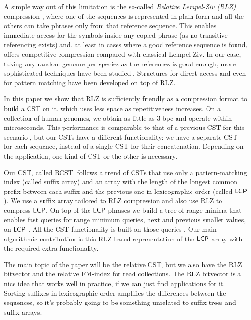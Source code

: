 A simple way out of this limitation is the so-called {\em Relative Lempel-Ziv
(RLZ)} compression \cite{Kuruppu2010}, where one of the sequences is represented
in plain form and all the others can take phrases only from that reference
sequence. This enables immediate access for the symbols inside any copied
phrase (as no transitive referencing exists) and, at least in cases where a
good reference sequence is found, offers competitive compression compared with
classical Lempel-Ziv. In our case, taking any random genome per species as the
references is good enough; more sophisticated techniques have been studied
\cite{KPZ11}. Structures for direct access \cite{DG11,Ferrada2014}
and even for pattern matching \cite{DJSS14,Belazzougui2014} have been developed
on top of RLZ.

In this paper we show that RLZ is sufficiently friendly as a compression format
to build a CST on it, which uses less space as repetitiveness increases. 
On a collection of human genomes, we obtain as little as 3 bpc and operate 
within microseconds. This performance is comparable to that of a previous CST 
for this scenario \cite{Navarro2014}, but our CSTs have a different 
functionality: we have a separate CST for each sequence, instead of a single
CST for their concatenation. Depending on the application, one kind of CST or
the other is necessary. 

Our CST, called RCST, follows a trend of CSTs \cite{Fischer2009a,Ohlebusch2009,Ohlebusch2010,Gog2011a,Abeliuk2013} that use only a pattern-matching index 
(called suffix array) and an array with the length of the longest common prefix
between each suffix and the previous one in lexicographic order (called $\textsf{LCP}$).
We use a suffix array tailored to RLZ compression \cite{Belazzougui2014} and 
also use RLZ to compress $\textsf{LCP}$. On top of the $\textsf{LCP}$ phrases we build a tree
of range minima that enables fast queries for range minimum queries, next and
previous smaller values, on $\textsf{LCP}$ \cite{Abeliuk2013}. All the CST functionality
is built on those queries \cite{Fischer2009a}. Our main algorithmic contribution
is this RLZ-based representation of the $\textsf{LCP}$ array with the required extra
functionality.

\iffalse
The main topic of the paper will be the relative CST, but we also have the RLZ
bitvector and the relative FM-index for read collections. The RLZ bitvector is
a nice idea that works well in practice, if we can just find applications for
it. Sorting suffixes in lexicographic order amplifies the differences between
the sequences, so it's probably going to be something unrelated to suffix
trees and suffix arrays.

